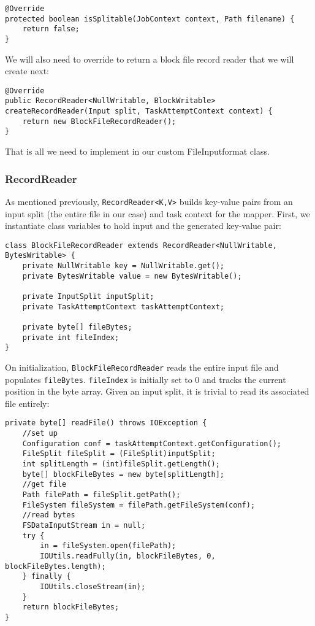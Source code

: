\documentclass[9pt,twocolumn,twoside]{idsi}
\begin{document}
\lstset{language=Java}
\begin{lstlisting}
@Override
protected boolean isSplitable(JobContext context, Path filename) {
    return false;
}
\end{lstlisting}

We will also need to override  to return a block file record reader that we will create next:

\begin{lstlisting}
@Override
public RecordReader<NullWritable, BlockWritable> createRecordReader(Input split, TaskAttemptContext context) {
    return new BlockFileRecordReader();
}
\end{lstlisting}

That is all we need to implement in our custom FileInputformat class.

\subsubsection{RecordReader}
As mentioned previously, \lstinline{RecordReader<K,V>} builds key-value pairs from an input split (the entire file in our case) and task context for the mapper. First, we instantiate class variables to hold input and the generated key-value pair:

\begin{lstlisting}
class BlockFileRecordReader extends RecordReader<NullWritable, BytesWritable> {
    private NullWritable key = NullWritable.get();
    private BytesWritable value = new BytesWritable();

    private InputSplit inputSplit;
    private TaskAttemptContext taskAttemptContext;

    private byte[] fileBytes;
    private int fileIndex;
}
\end{lstlisting}

On initialization, \lstinline{BlockFileRecordReader} reads the entire input file and populates \lstinline{fileBytes}. \lstinline{fileIndex} is initially set to 0 and tracks the current position in the byte array. Given an input split, it is trivial to read its associated file entirely:

\begin{lstlisting}
private byte[] readFile() throws IOException {
    //set up
    Configuration conf = taskAttemptContext.getConfiguration();
    FileSplit fileSplit = (FileSplit)inputSplit;
    int splitLength = (int)fileSplit.getLength();
    byte[] blockFileBytes = new byte[splitLength];
    //get file
    Path filePath = fileSplit.getPath();
    FileSystem fileSystem = filePath.getFileSystem(conf);
    //read bytes
    FSDataInputStream in = null;
    try {
        in = fileSystem.open(filePath);
        IOUtils.readFully(in, blockFileBytes, 0, blockFileBytes.length);
    } finally {
        IOUtils.closeStream(in);
    }
    return blockFileBytes;
}
\end{lstlisting}
\end{document}
